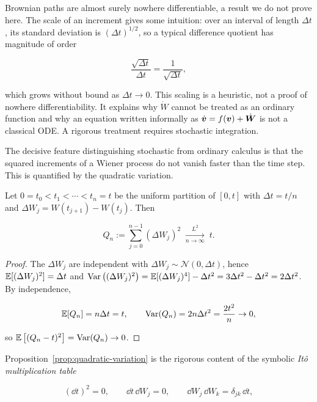 \begin{remark}
Brownian paths are almost surely nowhere differentiable, a result we do not prove here. The scale of an increment gives some intuition: over an 
interval of length $\Delta t$, its standard deviation is $(\Delta t)^{1/2}$, so a typical difference quotient has magnitude of order

\[
\frac{\sqrt{\Delta t}}{\Delta t}=\frac{1}{\sqrt{\Delta t}},
\] 

which grows without bound as $\Delta t\to0$. This scaling is a heuristic, not a proof of nowhere differentiability. It explains why $\dot W$ 
cannot be treated as an ordinary function and why an equation written informally as $\dot{\bm{v}}=f(\bm{v})+\dot{\bm{W}}$ is not a classical ODE. 
A rigorous treatment requires stochastic integration.
\end{remark}



The decisive feature distinguishing stochastic from ordinary calculus is that the squared increments of a Wiener process do not vanish faster than 
the time step. This is quantified by the quadratic variation.

\begin{proposition}
\label{prop:quadratic-variation}

Let $0=t_0<t_1<\cdots<t_n=t$ be the uniform partition of $[0,t]$ with $\Delta t=t/n$ and $\Delta W_j=W(t_{j+1})-W(t_j)$. Then

\[
Q_n:=\sum_{j=0}^{n-1}(\Delta W_j)^2\;\xrightarrow[n\to\infty]{L^2}\;t .
\]

\end{proposition}

\begin{proof}

The $\Delta W_j$ are independent with $\Delta W_j\sim\mathcal N(0,\Delta t)$, hence $\operatorname{\mathbb{E}}[(\Delta W_j)^2]=\Delta t$ and 
$\operatorname{Var}\big((\Delta W_j)^2\big)=\operatorname{\mathbb{E}}[(\Delta W_j)^4]-\Delta t^2=3\Delta t^2-\Delta t^2=2\Delta t^2$. By independence,

\[
\operatorname{\mathbb{E}}[Q_n]=n\Delta t=t,\qquad \operatorname{Var}(Q_n)=2n\Delta t^2=\frac{2t^2}{n}\to0,
\]

so $\operatorname{\mathbb{E}}\big[(Q_n-t)^2\big]=\operatorname{Var}(Q_n)\to0$.
\end{proof}

Proposition~\ref{prop:quadratic-variation} is the rigorous content of the symbolic \emph{It\^o multiplication table}

\begin{equation}
\label{eq:ito-table}
(\dd t)^2=0,\qquad \dd t\,\dd W_j=0,\qquad \dd W_j\,\dd W_k=\delta_{jk}\,\dd t,
\end{equation}

